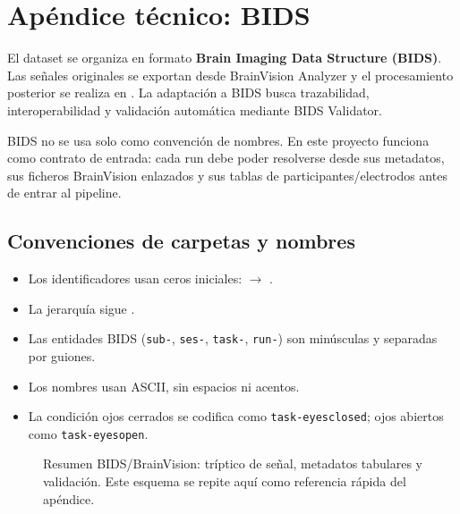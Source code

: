 \appendix

\section{Apéndice técnico: BIDS}

El dataset se organiza en formato \textbf{Brain Imaging Data Structure (BIDS)}. Las señales originales se exportan desde BrainVision Analyzer y el procesamiento posterior se realiza en \Julia{}. La adaptación a BIDS busca trazabilidad, interoperabilidad y validación automática mediante BIDS Validator.

\begin{decisionmetodologica}
BIDS no se usa solo como convención de nombres. En este proyecto funciona como contrato de entrada: cada run debe poder resolverse desde sus metadatos, sus ficheros BrainVision enlazados y sus tablas de participantes/electrodos antes de entrar al pipeline.
\end{decisionmetodologica}

\subsection{Convenciones de carpetas y nombres}

\begin{tcolorbox}[
  enhanced,
  breakable,
  colback=NSGray,
  colframe=NSLine,
  boxrule=0.5pt,
  arc=1.5mm,
  title=\textbf{Reglas prácticas de nomenclatura BIDS}
]
\begin{itemize}[leftmargin=*,itemsep=2pt,topsep=2pt]
\item Los identificadores usan ceros iniciales:  $\to$ .
\item La jerarquía sigue .
\item Las entidades BIDS (\texttt{sub-}, \texttt{ses-}, \texttt{task-}, \texttt{run-}) son minúsculas y separadas por guiones.
\item Los nombres usan ASCII, sin espacios ni acentos.
\item La condición ojos cerrados se codifica como \texttt{task-eyesclosed}; ojos abiertos como \texttt{task-eyesopen}.
\end{itemize}
\end{tcolorbox}

\begin{fullwidth}
\begin{figure}[H]
\centering
\resizebox{0.84\fulltextwidth}{!}{\NSBIDSBrainVision}
\caption{Resumen BIDS/BrainVision: tríptico de señal, metadatos tabulares y validación. Este esquema se repite aquí como referencia rápida del apéndice.}
\label{fig:appendix-bids-brainvision}
\end{figure}
\end{fullwidth}

